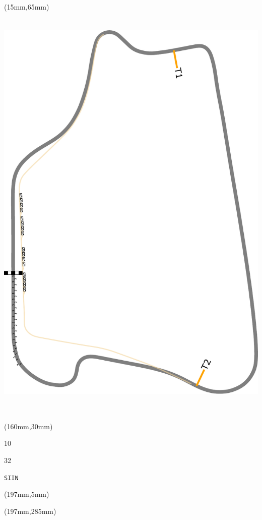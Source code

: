 \begin{textblock*}{185mm}(15mm,65mm)%
\centering
\mbox{\includegraphics[width=185mm,height=210mm,keepaspectratio]{PT/SIIN.pdf}}
\end{textblock*}
\begin{textblock*}{40mm}(160mm,30mm)%
\Large
\par{} 
\par10 
\par32 
\par\hfill\tiny\tt SIIN\\
\end{textblock*}
\begin{textblock*}{20mm}(197mm,5mm)%
\fbox{\thepage}
\label{SIIN}
\end{textblock*}
\begin{textblock*}{20mm}(197mm,285mm)%
\fbox{\thepage}
\end{textblock*}

